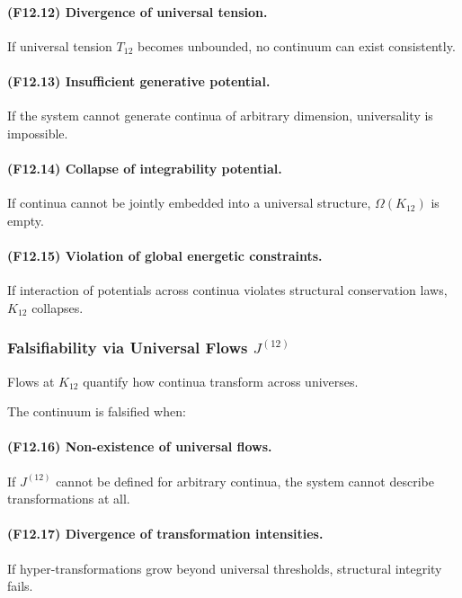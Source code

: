 \paragraph{(F12.12) Divergence of universal tension.}
If universal tension $T_{12}$ becomes unbounded,  
no continuum can exist consistently.

\paragraph{(F12.13) Insufficient generative potential.}
If the system cannot generate continua of arbitrary dimension,
universality is impossible.

\paragraph{(F12.14) Collapse of integrability potential.}
If continua cannot be jointly embedded into a universal structure,
$\Omega(K_{12})$ is empty.

\paragraph{(F12.15) Violation of global energetic constraints.}
If interaction of potentials across continua violates structural
conservation laws, $K_{12}$ collapses.



\subsubsection{Falsifiability via Universal Flows $J^{(12)}$}

Flows at $K_{12}$ quantify how continua transform across universes.

The continuum is falsified when:

\paragraph{(F12.16) Non-existence of universal flows.}
If $J^{(12)}$ cannot be defined for arbitrary continua,
the system cannot describe transformations at all.

\paragraph{(F12.17) Divergence of transformation intensities.}
If hyper-transformations grow beyond universal thresholds,
structural integrity fails.

